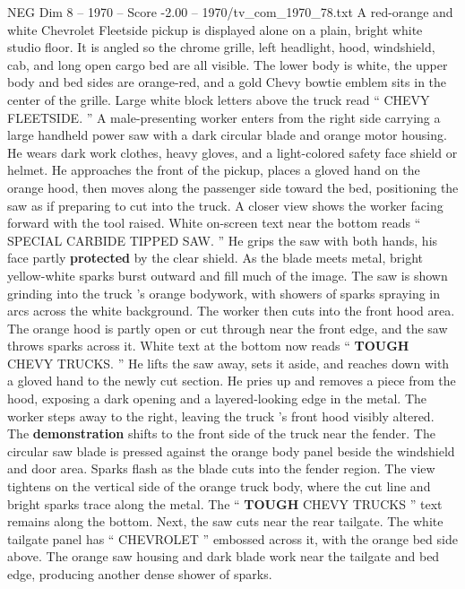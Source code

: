 \begin{textsample}{NEG Dim 8 – 1970 – Score -2.00 – 1970/tv\_com\_1970\_78.txt}  \label{ex:f8_neg_067}
A red-orange and white Chevrolet Fleetside pickup is displayed alone on a plain, bright white studio floor.
It is angled so the chrome grille, left headlight, hood, windshield, cab, and long open cargo bed are all visible.
The lower body is white, the upper body and bed sides are orange-red, and a gold Chevy bowtie emblem sits in the center of the grille.
Large white block letters above the truck read “ CHEVY FLEETSIDE. ” A male-presenting worker enters from the right side carrying a large handheld power saw with a dark circular blade and orange motor housing.
He wears dark work clothes, heavy gloves, and a light-colored safety face shield or helmet.
He approaches the front of the pickup, places a gloved hand on the orange hood, then moves along the passenger side toward the bed, positioning the saw as if preparing to cut into the truck.
A closer view shows the worker facing forward with the tool raised.
White on-screen text near the bottom reads “ SPECIAL CARBIDE TIPPED SAW. ” He grips the saw with both hands, his face partly \textbf{protected} by the clear shield.
As the blade meets metal, bright yellow-white sparks burst outward and fill much of the image.
The saw is shown grinding into the truck ’s orange bodywork, with showers of sparks spraying in arcs across the white background.
The worker then cuts into the front hood area.
The orange hood is partly open or cut through near the front edge, and the saw throws sparks across it.
White text at the bottom now reads “ \textbf{TOUGH} CHEVY TRUCKS. ” He lifts the saw away, sets it aside, and reaches down with a gloved hand to the newly cut section.
He pries up and removes a piece from the hood, exposing a dark opening and a layered-looking edge in the metal.
The worker steps away to the right, leaving the truck ’s front hood visibly altered.
The \textbf{demonstration} shifts to the front side of the truck near the fender.
The circular saw blade is pressed against the orange body panel beside the windshield and door area.
Sparks flash as the blade cuts into the fender region.
The view tightens on the vertical side of the orange truck body, where the cut line and bright sparks trace along the metal.
The “ \textbf{TOUGH} CHEVY TRUCKS ” text remains along the bottom.
Next, the saw cuts near the rear tailgate.
The white tailgate panel has “ CHEVROLET ” embossed across it, with the orange bed side above.
The orange saw housing and dark blade work near the tailgate and bed edge, producing another dense shower of sparks.

\end{textsample}
